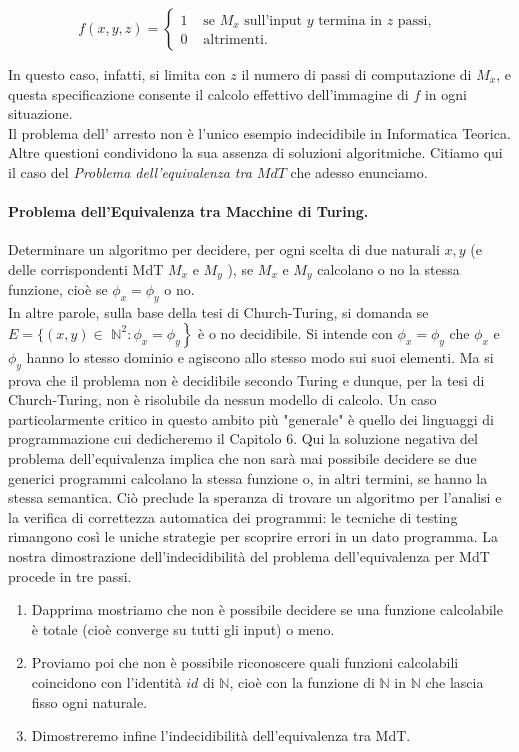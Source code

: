 \[
    f(x, y, z)= \begin{cases}1 & \text { se } M_x \text { sull'input } y \text { termina in } z \text { passi, } \\ 0 & \text { altrimenti. }\end{cases}
\]

In questo caso, infatti, si limita con $z$ il numero di passi di computazione di
$M_x$, e questa specificazione consente il calcolo effettivo dell'immagine di
$f$ in ogni situazione.\\ Il problema dell' arresto non è l'unico esempio
indecidibile in Informatica Teorica. Altre questioni condividono la sua assenza
di soluzioni algoritmiche. Citiamo qui il caso del \textit{Problema dell'equivalenza tra
    $MdT$} che adesso enunciamo.

\paragraph{Problema dell'Equivalenza tra Macchine di Turing.} Determinare un algoritmo per
decidere, per ogni scelta di due naturali $x, y$ (e delle corrispondenti MdT
$M_x$ e $M_y$ ), se $M_x$ e $M_y$ calcolano o no la stessa funzione, cioè se
$\phi_x=\phi_y$ o no.\\

In altre parole, sulla base della tesi di Church-Turing,
si domanda se $E=\{(x, y) \in$ $\left.\mathbb{N}^2: \phi_x=\phi_y\right\}$ è o
no decidibile. Si intende con $\phi_x=\phi_y$ che $\phi_x$ e $\phi_y$ hanno lo
stesso dominio e agiscono allo stesso modo sui suoi elementi. Ma si prova che il
problema non è decidibile secondo Turing e dunque, per la tesi di Church-Turing,
non è risolubile da nessun modello di calcolo. Un caso particolarmente critico
in questo ambito più "generale" è quello dei linguaggi di programmazione cui
dedicheremo il Capitolo 6. Qui la soluzione negativa del problema
dell'equivalenza implica che non sarà mai possibile decidere se due generici
programmi calcolano la stessa funzione o, in altri termini, se hanno la stessa
semantica. Ciò preclude la speranza di trovare un algoritmo per l'analisi e la
verifica di correttezza automatica dei programmi: le tecniche di testing
rimangono così le uniche strategie per scoprire errori in un dato programma. La
nostra dimostrazione dell'indecidibilità del problema dell'equivalenza per MdT
procede in tre passi.

\begin{enumerate}
    \item Dapprima mostriamo che non è possibile decidere se una funzione
          calcolabile è totale (cioè converge su tutti gli input) o meno.
    \item Proviamo poi che non è possibile riconoscere quali funzioni
          calcolabili coincidono con l'identità $i d$ di $\mathbb{N}$, cioè con
          la funzione di $\mathbb{N}$ in $\mathbb{N}$ che lascia fisso ogni
          naturale.
    \item Dimostreremo infine l'indecidibilità dell'equivalenza tra MdT.
\end{enumerate}

